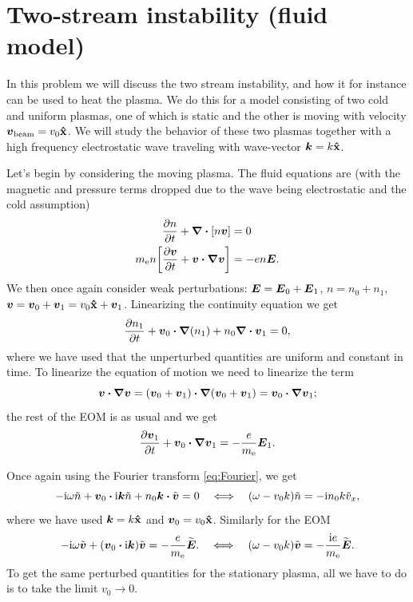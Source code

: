 \documentclass[11pt,a4paper, 
swedish, english %
]{article}
\newcommand{\mee}{\ensuremath{m_{\text{e}}}}
\begin{document}
\section{Two-stream instability (fluid model)}
\newcommand{\back}[2]{#1_{#2\text{back}}}
\newcommand{\beam}[2]{#1_{#2\text{beam}}}

In this problem we will discuss the two stream instability, and how it
for instance can be used to heat the plasma. We do this for a model
consisting of two cold and uniform plasmas, one of which is static and
the other is moving with velocity $\beam{\vb*v}{}=v_0\vu{x}$. We will
study the behavior of these two plasmas together with a high
frequency electrostatic wave traveling with wave-vector $\vb*k=k\vu{x}$.

Let's begin by considering the moving plasma. The fluid equations are
(with the magnetic and pressure terms dropped due to the wave being
electrostatic and the cold assumption)
\begin{align}
\pdv{n}{t}+\div\qty[n\vb*v]&=0\\
\mee n\qty[\pdv{\vb*v}{t}+\vb*v\vdot\grad\vb*v]&=-en\vb*E.
\end{align}
We then once again consider weak perturbations:
$\vb*E=\vb*E_0+\vb*E_1$, $n=n_0+n_1$,
$\vb*v=\vb*v_0+\vb*v_1=v_0\vu{x}+\vb*v_1$. Linearizing the continuity
equation we get
\begin{equation}\label{eq2:cont}
\pdv{n_1}{t} + \vb*v_0\vdot\grad(n_1)+n_0\div\vb*v_1=0,
\end{equation}
where we have used that the unperturbed quantities are uniform and
constant in time. To linearize the equation of motion we need to
linearize the term
\begin{equation}
\vb*v\vdot\grad\vb*v=(\vb*v_0+\vb*v_1)\vdot\grad(\vb*v_0+\vb*v_1)
=\vb*v_0\vdot\grad\vb*v_1;
\end{equation}
the rest of the EOM is as usual and we get
\begin{equation}\label{eq2:EOM}
\pdv{\vb*v_1}{t}+\vb*v_0\vdot\grad\vb*v_1
=-\frac{e}{\mee}\vb*E_1.
\end{equation}

Once again using the Fourier transform \eqref{eq:Fourier}, we get
\begin{equation}\label{eq2:ntilde}
-\ii\omega \tilde{n}+\vb*v_0\vdot\ii\vb*k\tilde{n} 
+ n_0\vb*k\vdot\tilde{\vb*v}=0
\quad\Longleftrightarrow\quad
(\omega-v_0k)\tilde{n}=-\ii n_0k\tilde{v}_{x},
\end{equation}
where we have used $\vb*k=k\vu{x}$ and $\vb*v_0=v_0\vu{x}$. Similarly
for the EOM
\begin{equation}\label{eq2:vtilde}
-\ii\omega\tilde{\vb*v}+(\vb*v_0\vdot\ii\vb*k)\tilde{\vb*v}
=-\frac{e}{\mee}\widetilde{\vb*E}.
\quad\Longleftrightarrow\quad
(\omega-v_0k)\tilde{\vb*v}=-\frac{\ii e}{\mee}\widetilde{\vb*E}.
\end{equation}
To get the same perturbed quantities for the stationary plasma, all
we have to do is to take the limit $v_0\to0$.
\end{document}
